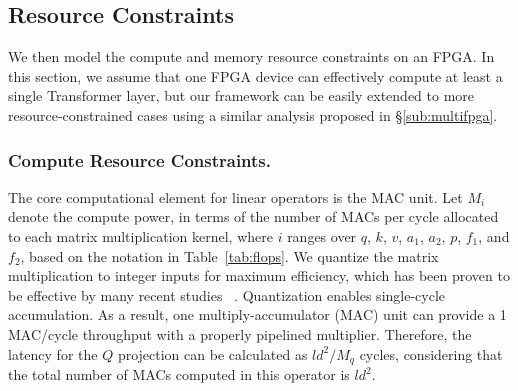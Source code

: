\subsection{Resource Constraints}
We then model the compute and memory resource constraints on an FPGA.
In this section, we assume that one FPGA device can effectively compute at least a single Transformer layer, but our framework can be easily extended to more resource-constrained cases using a similar analysis proposed in \S\ref{sub:multifpga}.

\subsubsection{Compute Resource Constraints.}
\label{subsubsec:compute_resource}
The core computational element for linear operators is the MAC unit.
Let $M_i$ denote the compute power, in terms of the number of MACs per cycle allocated to each matrix multiplication kernel, where $i$ ranges over $q$, $k$, $v$, $a_1$, $a_2$, $p$, $f_1$, and $f_2$, based on the notation in Table~\ref{tab:flops}.
We quantize the matrix multiplication to integer inputs for maximum efficiency, which has been proven to be effective by many recent studies ~\cite{xiao2023smoothquant,dettmers2022llmint8,sheng2020qbert,kim2021ibert}.
Quantization enables single-cycle accumulation.
As a result, one multiply-accumulator (MAC) unit can provide a 1 MAC/cycle throughput with a properly pipelined multiplier.
Therefore, the latency for the $Q$ projection can be calculated as $ld^2/M_{q}$ cycles, considering that the total number of MACs computed in this operator is $ld^2$.


